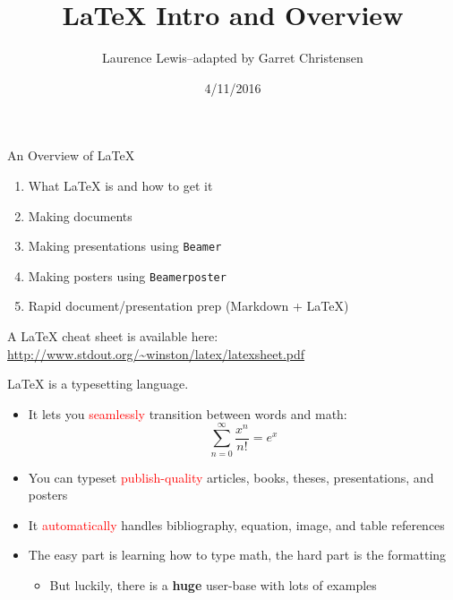 \documentclass{beamer}
\title{\LaTeX{} Intro and Overview}
\author{Laurence Lewis--adapted by Garret Christensen}
\institute{\texttt{garret@berkeley.edu}}
\date{4/11/2016}
\begin{document}
\begin{frame}
  \titlepage
\end{frame}



\begin{frame}{An Overview of \LaTeX{}}
	\begin{enumerate}
    	\item What \LaTeX{} is and how to get it
        \item Making documents
        \item Making presentations using \texttt{Beamer}
        \item Making posters using \texttt{Beamerposter}
        \item Rapid document/presentation prep (Markdown + \LaTeX{})
     \end{enumerate}
     \vfill
     A \LaTeX{} cheat sheet is available here:      \url{http://www.stdout.org/~winston/latex/latexsheet.pdf}
\end{frame}

\begin{frame}{\LaTeX{} is a typesetting language.}

	\begin{itemize} %
  	\item It lets you \textcolor{red}{seamlessly} transition between words and math: 
  	$$\sum_{n=0}^\infty\frac{x^n}{n!}=e^x$$
  	\item You can typeset \textcolor{red}{publish-quality} articles, books, theses, presentations, and posters
  	\item It \textcolor{red}{automatically} handles bibliography, equation, image, and table references
  	\item The easy part is learning how to type math, the hard part is the formatting
  		\begin{itemize}
    		\item But luckily, there is a \textbf{huge} user-base with lots of examples
    	\end{itemize}
	\end{itemize}
    
\end{frame}
    
\end{document}
